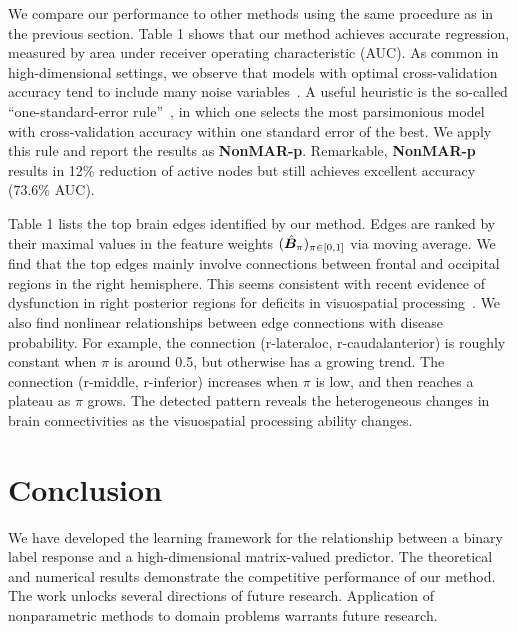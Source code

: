 \documentclass[11pt]{article}
\theoremstyle{definition}
\def\NonparaM{\text{\bf \small NonMAR }}
\begin{document}
We compare our performance to other methods using the same procedure as in the previous section. Table 1 shows that our method achieves accurate regression, measured by area under receiver operating characteristic (AUC). As common in high-dimensional settings, we observe that models with optimal cross-validation accuracy tend to include many noise variables~\citep{hastie2015statistical}. A useful heuristic is the so-called ``one-standard-error rule''~\citep{hastie2015statistical}, in which one selects the most parsimonious model with cross-validation accuracy within one standard error of the best. We apply this rule and report the results as {\bf \small NonMAR-p}. Remarkable, {\bf \small NonMAR-p} results in 12\% reduction of active nodes but still achieves excellent accuracy (73.6\% AUC). 



Table 1 lists the top brain edges identified by our method. Edges are ranked by their maximal values in the feature weights $(\hat {\bm B}_\pi)_{\pi \in [0,1]}$ via moving average. We find that the top edges mainly involve connections between frontal and occipital regions in the right hemisphere. This seems consistent with recent evidence of dysfunction in right posterior regions for deficits in visuospatial processing~\citep{wang2017common}. We also find nonlinear relationships between edge connections with disease probability. For example, the connection (r-lateraloc, r-caudalanterior) is roughly constant when $\pi$ is around 0.5, but otherwise has a growing trend. The connection (r-middle, r-inferior) increases when $\pi$ is low, and then reaches a plateau as $\pi$ grows. The detected pattern reveals the heterogeneous changes in brain connectivities as the visuospatial processing ability changes. 




\vspace{-.5cm}
\section{Conclusion}
\vspace{-.5cm}
We have developed the learning framework for the relationship between a binary label response and a high-dimensional matrix-valued predictor. 
The theoretical and numerical results demonstrate the competitive performance of our method.
The work unlocks several directions of future research. Application of nonparametric methods to domain problems warrants future research.


\singlespacing


\end{document}
